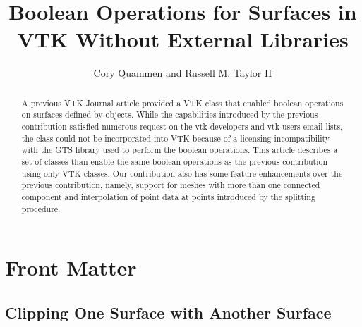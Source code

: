 \documentclass{InsightArticle}
\title{Boolean Operations for Surfaces in VTK Without External Libraries}
\author{Cory Quammen and Russell M. Taylor II}
\newcommand{\IJhandlerIDnumber}{1338}
\begin{document}
%
% 
\IJhandlefooter{\IJhandlerIDnumber}


\ifpdf
\else
\fi


\maketitle


\ifhtml
\chapter*{Front Matter\label{front}}
\fi


\begin{abstract}
\noindent
A previous VTK Journal article provided a VTK class that enabled boolean operations on surfaces defined by  objects. While the capabilities introduced by the previous contribution satisfied numerous request on the vtk-developers and vtk-users email lists, the class could not be incorporated into VTK because of a licensing incompatibility with the GTS library used to perform the boolean operations. This article describes a set of classes than enable the same boolean operations as the previous contribution using only VTK classes. Our contribution also has some feature enhancements over the previous contribution, namely,  support for meshes with more than one connected component and interpolation of point data at points introduced by the splitting procedure.

\end{abstract}

\IJhandlenote{\IJhandlerIDnumber}

\tableofcontents

\section{Clipping One Surface with Another Surface}
\end{document}

